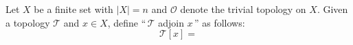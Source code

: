 \documentclass[12pt]{article}
\newcommand{\vertb}[1]{\left\vert#1\right\vert}      %
\begin{document}
\pagestyle{fancy}
\fancyhead{}

\normalsize

\noindent
Let $X$ be a finite set with $\vertb{X}=n$ and $\mathcal{O}$ denote the trivial topology on $X$. Given a topology $\mathcal{T}$ and $x\in X$, define ``\,$\mathcal{T}$ adjoin $x$\,'' as follows:
\[\mathcal{T}[x]=\]
\end{document}
